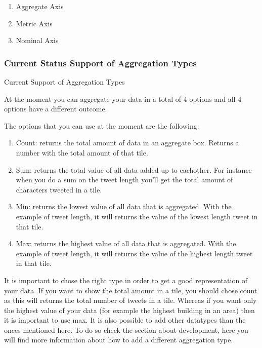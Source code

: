 \begin{enumerate}
	\item Aggregate Axis
	\item Metric Axis
	\item Nominal Axis
\end{enumerate}

\subsubsection{Current Status Support of Aggregation Types}

Current Support of Aggregation Types

At the moment you can aggregate your data in a total of 4 options and all 4 options have a different outcome.

The options that you can use at the moment are the following:
\begin{enumerate}
	
\item Count: returns the total amount of data in an aggregate box. Returns a number with the total amount of that tile.
\item Sum: returns the total value of all data added up to eachother. For instance when you do a sum on the tweet length you'll get the total amount of characters tweeted in a tile.
\item Min: returns the lowest value of all data that is aggregated. With the example of tweet length, it will returns the value of the lowest length tweet in that tile.
\item Max: returns the highest value of all data that is aggregated. With the example of tweet length, it will returns the value of the highest length tweet in that tile.
\end{enumerate}

It is important to chose the right type in order to get a good representation of your data. If you want to show the total amount in a tile, you should chose count as this will returns the total number of tweets in a tile. Whereas if you want only the highest value of your data (for example the highest building in an area) then it is important to use max. It is also possible to add other datatypes than the onces mentioned here. To do so check the section about development, here you will find more information about how to add a different aggregation type.
